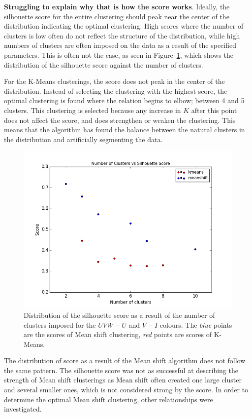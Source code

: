 \textbf{Struggling to explain why that is how the score works}. 
Ideally, the silhouette score for the entire clustering should peak near the center of the distribution indicating the optimal clustering. 
High scores where the number of clusters is low often do not reflect the structure of the distribution, while high numbers of clusters are often imposed on the data as a result of the specified parameters.
This is often not the case, as seen in Figure~\ref{fig:sscore}, which shows the distribution of the silhouette score against the number of clusters.

For the K-Means clusterings, the score does not peak in the center of the distribution.
Instead of selecting the clustering with the highest score, the optimal clustering is found where the relation begins to elbow; between 4 and 5 clusters.
This clustering is selected because any increase in $K$ after this point does not affect the score, and does strengthen or weaken the clustering.
This means that the algorithm has found the balance between the natural clusters in the distribution and artificially segmenting the data.

\begin{figure}[H]
\centering
\includegraphics[width=\linewidth]{figs/methods/UVW_U_score_vs_nclust}
\caption{Distribution of the silhouette score as a result of the number of clusters imposed for the $UVW - U$ and $V - I$ colours. The \textit{blue} points are the scores of Mean shift clustering, \textit{red} points are scores of K-Means.}
\label{fig:sscore}
\end{figure}

The distribution of score as a result of the Mean shift algorithm does not follow the same pattern.
The silhouette score was not as successful at describing the strength of Mean shift clusterings as Mean shift often created one large cluster and several smaller ones, which is not considered strong by the score.
In order to determine the optimal Mean shift clustering, other relationships were investigated.

